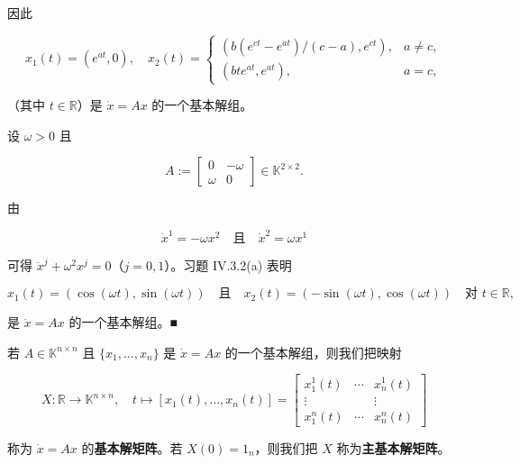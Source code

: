 \begin{example}
\begin{items}
因此

\begin{equation*}
x_{1}(t) = (e^{at},0) , \quad x_{2}(t) = \begin{cases} \left( b(e^{ct} - e^{at})/(c - a), e^{ct} \right) , & a \ne c , \\ (bte^{at}, e^{at}) , & a = c , \end{cases}
\end{equation*}

（其中 $ t \in \mathbb{R} $）是 $ \dot{x} = Ax $ 的一个基本解组。

\item

设 $ \omega > 0 $ 且

\begin{equation*}
A := \begin{bmatrix} 0 & -\omega \\ \omega & 0 \end{bmatrix} \in \mathbb{K}^{2\times 2} .
\end{equation*}

由

\[
\dot{x}^{1} = -\omega x^{2} \quad \text{且} \quad \dot{x}^{2} = \omega x^{1}
\]

可得 $ \ddot{x}^{j} + \omega^{2}x^{j} = 0 $（$ j = 0,1 $）。习题 IV.3.2(a) 表明

\[
x_{1}(t) = (\cos(\omega t),\sin(\omega t)) \quad \text{且} \quad x_{2}(t) = (-\sin(\omega t),\cos(\omega t)) \quad \text{对 } t \in \mathbb{R} ,
\]

是 $ \dot{x} = Ax $ 的一个基本解组。\nobreak\hspace{0.35em}■

\end{items}

若 $ A \in \mathbb{K}^{n\times n} $ 且 $ \{x_{1},\ldots,x_{n}\} $ 是 $ \dot{x} = Ax $ 的一个基本解组，则我们把映射

\begin{equation*}
X : \mathbb{R} \to \mathbb{K}^{n\times n} , \quad t \mapsto [x_{1}(t),\ldots,x_{n}(t)] = \begin{bmatrix} x_{1}^{1}(t) & \cdots & x_{n}^{1}(t) \\ \vdots & & \vdots \\ x_{1}^{n}(t) & \cdots & x_{n}^{n}(t) \end{bmatrix}
\end{equation*}

称为 $ \dot{x} = Ax $ 的\textbf{基本解矩阵}。若 $ X(0) = 1_{n} $，则我们把 $ X $ 称为\textbf{主基本解矩阵}。

\end{example}

